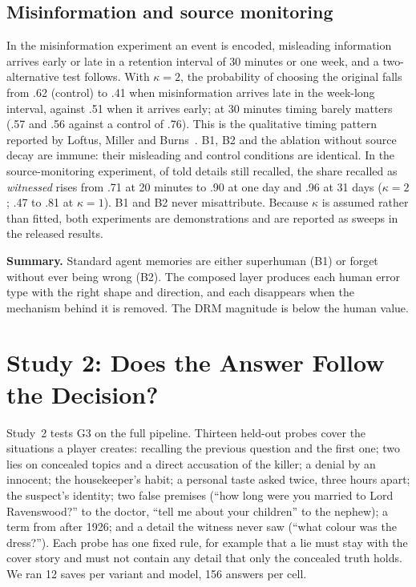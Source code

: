 \documentclass[conference]{IEEEtran}
\begin{document}
\subsection{Misinformation and source monitoring}
In the misinformation experiment an event is encoded, misleading information arrives early or late in
a retention interval of 30 minutes or one week, and a two-alternative test follows. With $\kappa = 2$,
the probability of choosing the original falls from .62 (control) to .41 when misinformation arrives
late in the week-long interval, against .51 when it arrives early; at 30 minutes timing barely matters
(.57 and .56 against a control of .76). This is the qualitative timing pattern reported by Loftus,
Miller and Burns~\cite{loftus1978}. B1, B2 and the ablation without source decay are immune: their
misleading and control conditions are identical. In the source-monitoring experiment, of told details
still recalled, the share recalled as \emph{witnessed} rises from .71 at 20 minutes to .90 at one day
and .96 at 31 days ($\kappa = 2$; .47 to .81 at $\kappa = 1$). B1 and B2 never misattribute. Because
$\kappa$ is assumed rather than fitted, both experiments are demonstrations and are reported as sweeps
in the released results.

\textbf{Summary.} Standard agent memories are either superhuman (B1) or forget without ever being wrong
(B2). The composed layer produces each human error type with the right shape and direction, and each
disappears when the mechanism behind it is removed. The DRM magnitude is below the human value.

\section{Study 2: Does the Answer Follow the Decision?}
\label{sec:study2}

Study~2 tests G3 on the full pipeline. Thirteen held-out probes cover the situations a player
creates: recalling the previous question and the first one; two lies on concealed topics and a direct
accusation of the killer; a denial by an innocent; the housekeeper's habit; a personal taste asked
twice, three hours apart; the suspect's identity; two false premises (``how long were you married to
Lord Ravenswood?'' to the doctor, ``tell me about your children'' to the nephew); a term from after
1926; and a detail the witness never saw (``what colour was the dress?''). Each probe has one fixed
rule, for example that a lie must stay with the cover story and must not contain any detail that only
the concealed truth holds. We ran 12 saves per variant and model, 156 answers per cell.
\end{document}
